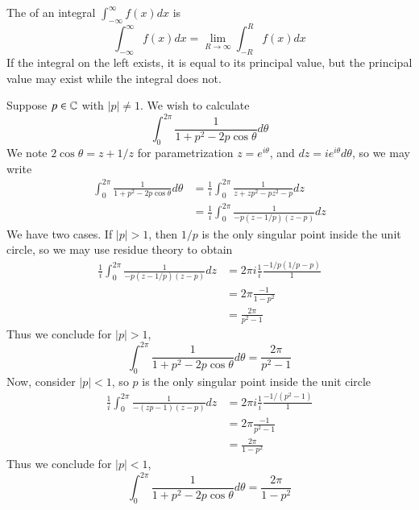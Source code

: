 \documentclass[12pt, a4paper, oneside, openright, titlepage]{book}
\begin{document}
\begin{rmk}
    The  of an integral $\int_{-\infty}^{\infty}f(x)dx$ is \begin{equation*}
        \int_{-\infty}^{\infty}f(x)dx = \lim\limits_{R\rightarrow \infty}\int_{-R}^{R}f(x)dx
    \end{equation*}
    If the integral on the left exists, it is equal to its principal value, but the principal value may exist while the integral does not.
\end{rmk}

\begin{eg}
    Suppose $p \in \mathbb C$ with $|p| \neq 1$. We wish to calculate \begin{equation*}
        \int_0^{2\pi}\frac{1}{1+p^2-2p\cos\theta}d\theta
    \end{equation*}
    We note $2\cos\theta = z+1/z$ for parametrization $z = e^{i\theta}$, and $dz = ie^{i\theta}d\theta$, so we may write \begin{align*}
        \int_0^{2\pi}\frac{1}{1+p^2-2p\cos\theta}d\theta &= \frac{1}{i}\int_0^{2\pi}\frac{1}{z+zp^2-pz^2-p}dz \\
        &= \frac{1}{i}\int_0^{2\pi}\frac{1}{-p(z-1/p)(z-p)}dz 
    \end{align*}
    We have two cases. If $|p| > 1$, then $1/p$ is the only singular point inside the unit circle, so we may use residue theory to obtain \begin{align*}
        \frac{1}{i}\int_0^{2\pi}\frac{1}{-p(z-1/p)(z-p)}dz &= 2\pi i\frac{1}{i}\frac{-1/p(1/p-p)}{1} \\
        &= 2\pi\frac{-1}{1-p^2} \\
        &= \frac{2\pi}{p^2-1}
    \end{align*}
    Thus we conclude for $|p| > 1$, \begin{equation*}
        \int_0^{2\pi}\frac{1}{1+p^2-2p\cos\theta}d\theta = \frac{2\pi}{p^2-1}
    \end{equation*}
    Now, consider $|p|<1$, so $p$ is the only singular point inside the unit circle \begin{align*}
        \frac{1}{i}\int_0^{2\pi}\frac{1}{-(zp-1)(z-p)}dz &= 2\pi i\frac{1}{i}\frac{-1/(p^2-1)}{1} \\
        &= 2\pi\frac{-1}{p^2-1} \\
        &= \frac{2\pi}{1-p^2}
    \end{align*}
    Thus we conclude for $|p| < 1$, \begin{equation*}
        \int_0^{2\pi}\frac{1}{1+p^2-2p\cos\theta}d\theta = \frac{2\pi}{1-p^2}
    \end{equation*}
\end{eg}
\end{document}
